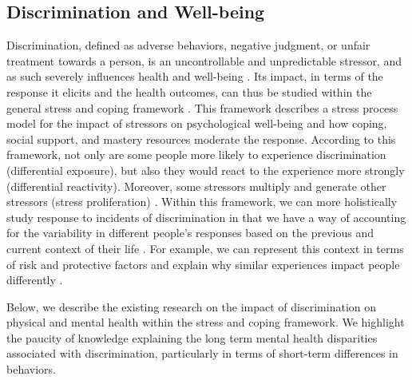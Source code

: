 \subsection{Discrimination and Well-being}
\label{sec:back-discrimination}
\noindent 
Discrimination, defined as adverse behaviors, negative judgment, or unfair treatment towards a person, is an uncontrollable and unpredictable stressor, and as such severely influences health and well-being \cite{Williams:2009}. %
Its impact, in terms of the response it elicits and the health outcomes, can thus be studied within the general stress and coping framework \cite{Pieterse:2007}. %
This framework describes a stress process model for the impact of stressors on psychological well-being and how coping, social support, and mastery resources moderate the response. According to this framework, not only are some people more likely to experience discrimination (differential exposure), but also they would react to the experience more strongly (differential reactivity). Moreover, some stressors multiply and generate other stressors (stress proliferation) \cite{Pearlin:1999}. %
Within this framework, we can more holistically study response to incidents of discrimination in that we have a way of accounting for the variability in different people's responses based on the previous and current context of their life \cite{Ong:2009}. For example, we can represent this context in terms of risk and protective factors and explain why similar experiences impact people differently \cite{SeridoAlmeidaWethington:2004}. %

Below, we describe the existing research on the impact of discrimination on physical and mental health within the stress and coping framework. We highlight the paucity of knowledge explaining the long term mental health disparities associated with discrimination, particularly in terms of short-term differences in behaviors. %

